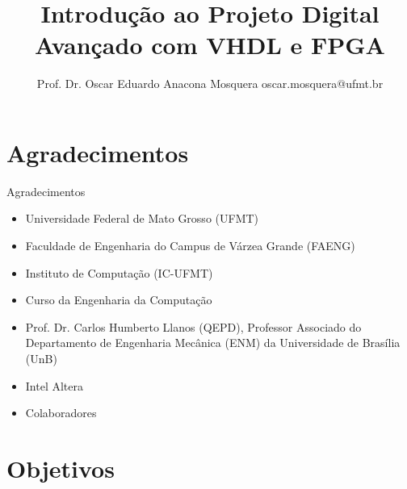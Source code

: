 \documentclass[aspectratio=169]{beamer}
\title[Minicurso FPGAs]{\huge   Introdução ao Projeto Digital Avançado com VHDL e FPGA}
\author[Prof. Dr. Oscar Eduardo Anacona Mosquera]{Prof. Dr. Oscar Eduardo Anacona Mosquera \newline\newline 
\scriptsize{oscar.mosquera@ufmt.br}
}
\begin{document}
\begin{frame}[plain]
\titlepage

\end{frame}

\section{Agradecimentos}


\begin{frame}{Agradecimentos}
	
	\begin{itemize}
		\item Universidade Federal de Mato Grosso (UFMT)
		\item Faculdade de Engenharia do Campus de Várzea Grande (FAENG)
		\item Instituto de Computação (IC-UFMT)
		\item Curso da Engenharia da Computação
		\item Prof. Dr. Carlos Humberto Llanos (QEPD), Professor Associado do Departamento de Engenharia Mecânica (ENM) da Universidade de Brasília (UnB)
		\item  Intel Altera
		\item  Colaboradores
	\end{itemize}	
	
\end{frame}
\section{Objetivos}
\end{document}
